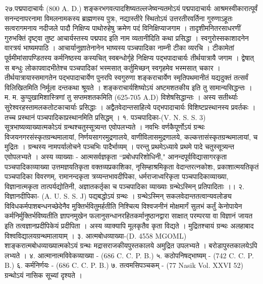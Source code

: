 २७.पद्मपादाचार्यः (800 A. D.)
शङ्करभगवत्पादशिष्यतल्लजेष्वन्यतमोऽयं पद्मपादाचार्यः आश्रमस्वीकारात्पूर्वं सनन्दनापरनामा विमलनामकस्य ब्राह्मणस्य पुत्रः, नद्यास्तीरे स्थितोऽयं उत्तरतीरवर्तिना गुरुणाऽहूतः सत्वरागमनाय नदीजले पादौ निक्षिप्य पाथोरुहेषु क्रमेण पदं विनिक्षिप्याजगाम । तादृशीमनितरसाधरणीं गुरुभक्तिं दृष्ट्वा तुष्ट आचार्यस्तस्य पद्मपाद इति नाम व्यतानीदिति कथा प्रसिद्धा । स्वगुरोस्सकाशादनेन वारत्रयं भाष्यमपाठि । आचार्यानुज्ञातेनानेन भाष्यस्य पञ्चपादिका नाम्नी टीका व्यरचि ।
टीकामेतां पूर्वमीमांसापण्डितस्य कर्मनिष्ठस्य कस्यचित् स्वबन्धोर्गृहे निक्षिप्य पद्भपादाचार्यः तीर्थयात्रायै जगाम । द्वेषात् स बन्धुः लोकापवादभीतेश्च पञ्चपादिकां भस्मसात् कर्तुमिच्छन् स्वगृहमेव भस्मसात् चकार । तीर्थयात्रायास्समागतेन पद्भपादाचार्येण पुनरपि स्वगुरुणा शङ्कराचार्येण स्मृतिपथमानीतं यद्यदुक्तं तत्सर्वं विलिखितमिति निर्मूला दन्तकथा श्रूयते ।
शङ्कराचार्यशिष्योऽयं अष्टमशतकीय इति तु सामान्यसिद्धन्तः । म. म. कुप्पुखामिशास्त्रिणां तु सप्तमशतकमिति (625-705 A.D) विशेषसिद्धान्तः । अस्य सतीर्थ्याः सुरेश्वरहस्तामलकतोटकाचार्याः प्रसिद्धाः । अद्वैतवेदान्तसाहित्ये पद्भपादाचार्यः विशिष्टप्रस्थानस्य प्रवर्तकः । तच्च प्रस्थानं पञ्चपादिकाप्रस्थानमिति प्रसिद्धम् ।
१. पञ्चपादिका-(V. N. S. S. 3)
सूत्रभाष्यव्याख्यात्मकोऽयं ग्रन्थश्चतुस्सूत्र्यन्त एवोपलभ्यते । नवभिः वर्णकैपूर्णोऽयं ग्रन्थः विजयनगरसंस्कृतग्रन्थमालायां, निर्णयसागरमुद्रणालये, वाणीविलासमुद्रणालये, कल्कत्तासंस्कृतग्रन्थमालायां, च मुद्रितः । ग्रन्थस्य नामपर्यालोचने पञ्चभिः पादैर्भाव्यम् । परन्तु प्रथमेऽध्याये प्रथमे पादे चतुस्सूत्र्यन्त एवोपलभ्यते । अस्य व्याख्याः - आत्मसर्वज्ञकृता ``प्रबोधपरिशोधिनी," आनन्दपूर्वविद्यासागरकृता पञ्चपादिकाव्याख्या उत्तमज्ञयतिकृता वक्तव्यप्रकाशिका, नृसिम्हाश्रमिकृता वेदान्तरत्नकोशः, प्रकाशात्मयतिकृतं पञ्चपादिका विवरणम्, रामानन्दकृता त्रय्यन्तभावदीपिका, धर्मराजाध्वरिकृता पञ्चपादिकाव्याख्या, विज्ञानात्मकृता तात्पर्यद्योतिनी, अज्ञातकर्तृका च पञ्चपादिका व्याख्याः ग्रन्थेऽस्मिन् प्रतिपादिताः ।।
२. विज्ञानदीपिका- (A. U. S. S. J)
पद्यबद्धोऽयं ग्रन्थः । ग्रन्थेऽस्मिन् सकलवेदान्ततत्वान्यवलोङ्य विविधकर्मपाशबन्धनच्छेदेनैव मुक्तिर्भवितुमर्हतीति निश्चित्य विश्वजनीनं मोक्षमार्गं सुलभं कर्तुं केनोपायेन कर्मनिर्मुक्तिर्भविष्यतीति ज्ञापनमुखेन फलानुसन्धानरहितकर्मानुष्ठानद्वारा साक्षात् परम्परया वा विज्ञानं जायत इति तत्वज्ञानप्रदीपिकेयं प्रदीपिता । अस्य व्याक्यापि मूलकृतैव कृता विद्यते । मुद्रितश्चायं ग्रन्थः अलहाबाद विश्वविद्यालयग्रन्थमालायाम् ।
३. आत्मबोधव्याख्या-(D. 4558 MGOML)
शाङ्करात्मबोधव्याख्यात्मकोऽयं ग्रन्थः मद्रासराजकीयपुस्तकालये अमुद्रित उपलभ्यते । बरोडापुस्तकालयेऽपि लभ्यते ।
४. आत्मानात्मविवेकव्याख्या - (686 C. C. P. B.)
५. कठोपनिषद्भाष्यम् - (742 C. C. P. B.)
६. कर्मनिर्णयः - (686 C. C. P. B.)
७. तत्वमसिपञ्चकम् - (77 Nasik Vol. XXVI 52) ग्रन्थोऽयं नासिक सूच्यां दृश्यते ।
